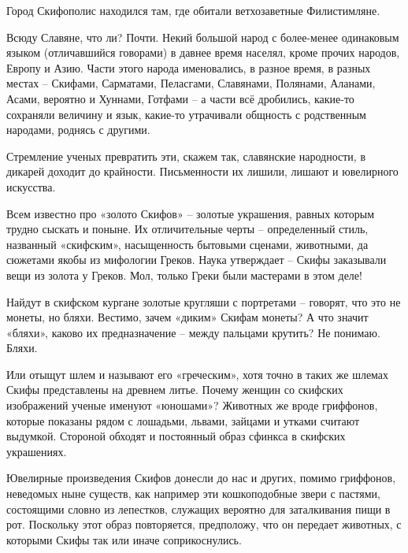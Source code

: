 Город Скифополис находился там, где обитали ветхозаветные Филистимляне.

Всюду Славяне, что ли? Почти. Некий большой народ с более-менее одинаковым языком (отличавшийся говорами) в давнее время населял, кроме прочих народов, Европу и Азию. Части этого народа именовались, в разное время, в разных местах – Скифами, Сарматами, Пеласгами, Славянами, Полянами, Аланами, Асами, вероятно и Хуннами, Готфами – а части всё дробились, какие-то сохраняли величину и язык, какие-то утрачивали общность с родственным народами, роднясь с другими.

Стремление ученых превратить эти, скажем так, славянские народности, в дикарей доходит до крайности. Письменности их лишили, лишают и ювелирного искусства. 

Всем известно про «золото Скифов» – золотые украшения, равных которым трудно сыскать и поныне. Их отличительные черты – определенный стиль, названный «скифским», насыщенность бытовыми сценами, животными, да сюжетами якобы из мифологии Греков. Наука утверждает – Скифы заказывали вещи из золота у Греков. Мол, только Греки были мастерами в этом деле!
  
Найдут в скифском кургане золотые кругляши с портретами – говорят, что это не монеты, но бляхи. Вестимо, зачем «диким» Скифам монеты? А что значит «бляхи», каково их предназначение – между пальцами крутить? Не понимаю. Бляхи. 

Или отыщут шлем и называют его «греческим», хотя точно в таких же шлемах Скифы представлены на древнем литье. Почему женщин со скифских изображений ученые именуют «юношами»? Животных же вроде гриффонов, которые показаны рядом с лошадьми, львами, зайцами и утками считают выдумкой. Стороной обходят и постоянный образ сфинкса в скифских украшениях.


Ювелирные произведения Скифов донесли до нас и других, помимо гриффонов, неведомых ныне существ, как например эти кошкоподобные звери с пастями, состоящими словно из лепестков, служащих вероятно для заталкивания пищи в рот. Поскольку этот образ повторяется, предположу, что он передает животных, с которыми Скифы так или иначе соприкоснулись.

